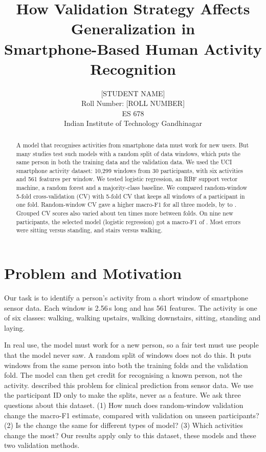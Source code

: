 \documentclass{article}
\title{How Validation Strategy Affects Generalization in\\Smartphone-Based Human Activity Recognition}
\author{%
  [STUDENT NAME] \\
  Roll Number: [ROLL NUMBER] \\
  ES 678 \\
  Indian Institute of Technology Gandhinagar
}
\begin{document}
\maketitle

\begin{abstract}
A model that recognises activities from smartphone data must work for new users. But many studies test such models with a random split of data windows, which puts the same person in both the training data and the validation data. We used the UCI smartphone activity dataset: 10,299 windows from 30 participants, with six activities and 561 features per window. We tested logistic regression, an RBF support vector machine, a random forest and a majority-class baseline. We compared random-window 5-fold cross-validation (CV) with 5-fold CV that keeps all windows of a participant in one fold. Random-window CV gave a higher macro-F1 for all three models, by \Ngapmin{} to \Ngapmax{}. Grouped CV scores also varied about ten times more between folds. On nine new participants, the selected model (logistic regression) got a macro-F1 of \Ntestf{}. Most errors were sitting versus standing, and stairs versus walking.
\end{abstract}

\section{Problem and Motivation}
Our task is to identify a person's activity from a short window of smartphone sensor data. Each window is 2.56\,s long and has 561 features. The activity is one of six classes: walking, walking upstairs, walking downstairs, sitting, standing and laying.

In real use, the model must work for a new person, so a fair test must use people that the model never saw. A random split of windows does not do this. It puts windows from the same person into both the training folds and the validation fold. The model can then get credit for recognising a known person, not the activity. \citet{saeb2017} described this problem for clinical prediction from sensor data. We use the participant ID only to make the splits, never as a feature. We ask three questions about this dataset. (1) How much does random-window validation change the macro-F1 estimate, compared with validation on unseen participants? (2) Is the change the same for different types of model? (3) Which activities change the most? Our results apply only to this dataset, these models and these two validation methods.
\end{document}
